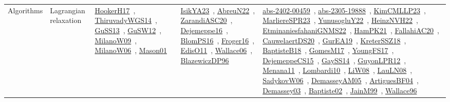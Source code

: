 {\begin{longtable}{lp{3cm}>{\raggedright\arraybackslash}p{6cm}>{\raggedright\arraybackslash}p{6cm}>{\raggedright\arraybackslash}p{8cm}}
Algorithms & Lagrangian relaxation & \href{../works/HookerH17.pdf}{HookerH17}~\cite{HookerH17}, \href{../works/ThiruvadyWGS14.pdf}{ThiruvadyWGS14}~\cite{ThiruvadyWGS14}, \href{../works/GuSS13.pdf}{GuSS13}~\cite{GuSS13}, \href{../works/GuSW12.pdf}{GuSW12}~\cite{GuSW12}, \href{../works/MilanoW09.pdf}{MilanoW09}~\cite{MilanoW09}, \href{../works/MilanoW06.pdf}{MilanoW06}~\cite{MilanoW06}, \href{../works/Mason01.pdf}{Mason01}~\cite{Mason01} & \href{../works/IsikYA23.pdf}{IsikYA23}~\cite{IsikYA23}, \href{../works/AbreuN22.pdf}{AbreuN22}~\cite{AbreuN22}, \href{../works/ZarandiASC20.pdf}{ZarandiASC20}~\cite{ZarandiASC20}, \href{../works/Dejemeppe16.pdf}{Dejemeppe16}~\cite{Dejemeppe16}, \href{../works/BlomPS16.pdf}{BlomPS16}~\cite{BlomPS16}, \href{../works/Froger16.pdf}{Froger16}~\cite{Froger16}, \href{../works/EdisO11.pdf}{EdisO11}~\cite{EdisO11}, \href{../works/Wallace06.pdf}{Wallace06}~\cite{Wallace06}, \href{../works/BlazewiczDP96.pdf}{BlazewiczDP96}~\cite{BlazewiczDP96} & \href{../works/abs-2402-00459.pdf}{abs-2402-00459}~\cite{abs-2402-00459}, \href{../works/abs-2305-19888.pdf}{abs-2305-19888}~\cite{abs-2305-19888}, \href{../works/KimCMLLP23.pdf}{KimCMLLP23}~\cite{KimCMLLP23}, \href{../works/MarliereSPR23.pdf}{MarliereSPR23}~\cite{MarliereSPR23}, \href{../works/YunusogluY22.pdf}{YunusogluY22}~\cite{YunusogluY22}, \href{../works/HeinzNVH22.pdf}{HeinzNVH22}~\cite{HeinzNVH22}, \href{../works/EtminaniesfahaniGNMS22.pdf}{EtminaniesfahaniGNMS22}~\cite{EtminaniesfahaniGNMS22}, \href{../works/HamPK21.pdf}{HamPK21}~\cite{HamPK21}, \href{../works/FallahiAC20.pdf}{FallahiAC20}~\cite{FallahiAC20}, \href{../works/CauwelaertDS20.pdf}{CauwelaertDS20}~\cite{CauwelaertDS20}, \href{../works/GurEA19.pdf}{GurEA19}~\cite{GurEA19}, \href{../works/KreterSSZ18.pdf}{KreterSSZ18}~\cite{KreterSSZ18}, \href{../works/BaptisteB18.pdf}{BaptisteB18}~\cite{BaptisteB18}, \href{../works/GomesM17.pdf}{GomesM17}~\cite{GomesM17}, \href{../works/YoungFS17.pdf}{YoungFS17}~\cite{YoungFS17}, \href{../works/DejemeppeCS15.pdf}{DejemeppeCS15}~\cite{DejemeppeCS15}, \href{../works/GaySS14.pdf}{GaySS14}~\cite{GaySS14}, \href{../works/GuyonLPR12.pdf}{GuyonLPR12}~\cite{GuyonLPR12}, \href{../works/Menana11.pdf}{Menana11}~\cite{Menana11}, \href{../works/Lombardi10.pdf}{Lombardi10}~\cite{Lombardi10}, \href{../works/LiW08.pdf}{LiW08}~\cite{LiW08}, \href{../works/LauLN08.pdf}{LauLN08}~\cite{LauLN08}, \href{../works/SadykovW06.pdf}{SadykovW06}~\cite{SadykovW06}, \href{../works/DemasseyAM05.pdf}{DemasseyAM05}~\cite{DemasseyAM05}, \href{../works/ArtiguesBF04.pdf}{ArtiguesBF04}~\cite{ArtiguesBF04}, \href{../works/Demassey03.pdf}{Demassey03}~\cite{Demassey03}, \href{../works/Baptiste02.pdf}{Baptiste02}~\cite{Baptiste02}, \href{../works/JainM99.pdf}{JainM99}~\cite{JainM99}, \href{../works/Wallace96.pdf}{Wallace96}~\cite{Wallace96}\\

\end{longtable}}
